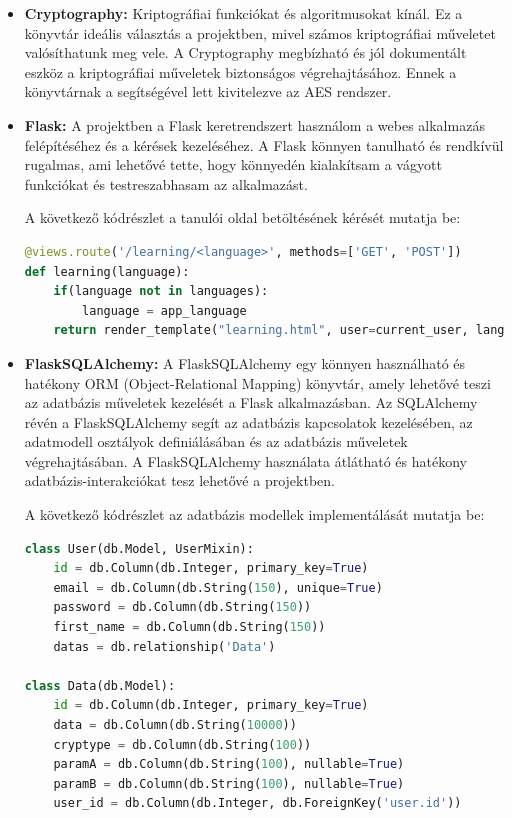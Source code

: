 \begin{itemize}
  	\item\textbf{Cryptography:}
Kriptográfiai funkciókat és algoritmusokat kínál. Ez a könyvtár ideális választás a projektben, mivel számos kriptográfiai műveletet valósíthatunk meg vele. A Cryptography megbízható és jól dokumentált eszköz a kriptográfiai műveletek biztonságos végrehajtásához. Ennek a könyvtárnak a segítségével lett kivitelezve az AES rendszer.

 	 \item\textbf{Flask:}
A projektben a Flask keretrendszert használom a webes alkalmazás felépítéséhez és a kérések kezeléséhez. A Flask könnyen tanulható és rendkívül rugalmas, ami lehetővé tette, hogy könnyedén kialakítsam a vágyott funkciókat és testreszabhasam az alkalmazást.

A következő kódrészlet a tanulói oldal betöltésének kérését mutatja be:
\begin{lstlisting}[caption={Learning oldal renderelése}, captionpos=b, language = Python]
@views.route('/learning/<language>', methods=['GET', 'POST'])
def learning(language):
    if(language not in languages):
        language = app_language
    return render_template("learning.html", user=current_user, language=language, **languages[language])
\end{lstlisting}

 	 \item\textbf{FlaskSQLAlchemy:}
A FlaskSQLAlchemy egy könnyen használható és hatékony ORM (Object-Relational Mapping) könyvtár, amely lehetővé teszi az adatbázis műveletek kezelését a Flask alkalmazásban. Az SQLAlchemy révén a FlaskSQLAlchemy segít az adatbázis kapcsolatok kezelésében, az adatmodell osztályok definiálásában és az adatbázis műveletek végrehajtásában. A FlaskSQLAlchemy használata átlátható és hatékony adatbázis-interakciókat tesz lehetővé a projektben.

A következő kódrészlet az adatbázis modellek implementálását mutatja be:
\begin{lstlisting}[caption={Adatbázis modellek}, captionpos=b, language = Python]
class User(db.Model, UserMixin):
    id = db.Column(db.Integer, primary_key=True)
    email = db.Column(db.String(150), unique=True)
    password = db.Column(db.String(150))
    first_name = db.Column(db.String(150))
    datas = db.relationship('Data')

class Data(db.Model):
    id = db.Column(db.Integer, primary_key=True)
    data = db.Column(db.String(10000))
    cryptype = db.Column(db.String(100))
    paramA = db.Column(db.String(100), nullable=True)
    paramB = db.Column(db.String(100), nullable=True)
    user_id = db.Column(db.Integer, db.ForeignKey('user.id'))
\end{lstlisting}


\end{itemize}
